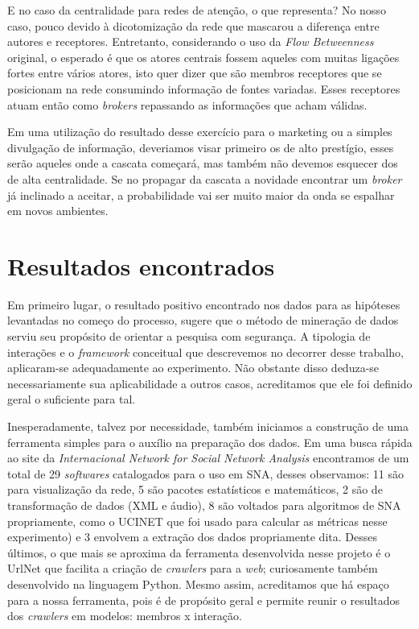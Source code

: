 E no caso da centralidade para redes de atenção, o que representa? No nosso
caso, pouco devido à dicotomização da rede que mascarou a diferença entre
autores e receptores. Entretanto, considerando o uso da \emph{Flow Betweenness}
original, o esperado é que os atores centrais fossem aqueles com muitas ligações
fortes entre vários atores, isto quer dizer que são membros receptores que se
posicionam na rede consumindo informação de fontes variadas. Esses receptores
atuam então como \emph{brokers} repassando as informações que acham válidas. 

Em uma utilização do resultado desse exercício para o marketing ou a simples
divulgação de informação, deveriamos visar primeiro os de alto prestígio, esses
serão aqueles onde a cascata começará, mas também não devemos esquecer dos de
alta centralidade. Se no propagar da cascata a novidade encontrar um
\emph{broker} já inclinado a aceitar, a probabilidade vai ser muito maior da
onda se espalhar em novos ambientes.

\section{Resultados encontrados}
\label{ap:sec:resultados}

Em primeiro lugar, o resultado positivo encontrado nos dados para as hipóteses
levantadas no começo do processo, sugere que o método de mineração de dados
serviu seu propósito de orientar a pesquisa com segurança. A tipologia de
interações e o \emph{framework} conceitual que descrevemos no decorrer desse
trabalho, aplicaram-se adequadamente ao experimento. Não obstante disso deduza-se
necessariamente sua aplicabilidade a outros casos, acreditamos que ele foi
definido geral o suficiente para tal.

Inesperadamente, talvez por necessidade, também iniciamos a construção de uma
ferramenta simples para o auxílio na preparação dos dados. Em uma busca rápida ao
site da \emph{Internacional Network for Social Network Analysis}
\citep{INSNA2010} encontramos de um total de 29 \emph{softwares} catalogados para
o uso em SNA, desses observamos: 11 são para visualização da rede, 5 são pacotes
estatísticos e matemáticos, 2 são de transformação de dados (XML e áudio), 8 são
voltados para algoritmos de SNA propriamente, como o UCINET \citep{Borgatti2010}
que foi usado para calcular as métricas nesse experimento) e 3 envolvem a
extração dos dados propriamente dita. Desses últimos, o que mais se aproxima da
ferramenta desenvolvida nesse projeto é o UrlNet \citep{Hunscher2010} que
facilita a criação de \emph{crawlers} para a \emph{web}; curiosamente também
desenvolvido na linguagem Python. Mesmo assim, acreditamos que há espaço para a
nossa ferramenta, pois é de propósito geral e permite reunir o resultados dos
\emph{crawlers} em modelos: membros x interação.

 

